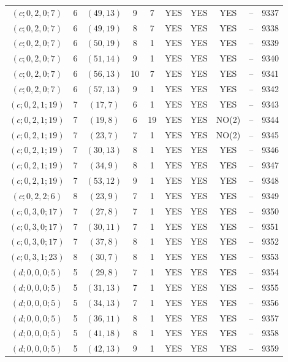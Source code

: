 \begin{longtable}{|c|c|c|c|c|c|c|c|c|c|}
$(c; 0, 2, 0; 7)$ & 6 & $(49, 13)$ & 9 & 7 & YES & YES & YES & -- & 9337\\
$(c; 0, 2, 0; 7)$ & 6 & $(49, 19)$ & 8 & 7 & YES & YES & YES & -- & 9338\\
$(c; 0, 2, 0; 7)$ & 6 & $(50, 19)$ & 8 & 1 & YES & YES & YES & -- & 9339\\
$(c; 0, 2, 0; 7)$ & 6 & $(51, 14)$ & 9 & 1 & YES & YES & YES & -- & 9340\\
$(c; 0, 2, 0; 7)$ & 6 & $(56, 13)$ & 10 & 7 & YES & YES & YES & -- & 9341\\
$(c; 0, 2, 0; 7)$ & 6 & $(57, 13)$ & 9 & 1 & YES & YES & YES & -- & 9342\\
$(c; 0, 2, 1; 19)$ & 7 & $(17, 7)$ & 6 & 1 & YES & YES & YES & -- & 9343\\
$(c; 0, 2, 1; 19)$ & 7 & $(19, 8)$ & 6 & 19 & YES & YES & NO(2) & -- & 9344\\
$(c; 0, 2, 1; 19)$ & 7 & $(23, 7)$ & 7 & 1 & YES & YES & NO(2) & -- & 9345\\
$(c; 0, 2, 1; 19)$ & 7 & $(30, 13)$ & 8 & 1 & YES & YES & YES & -- & 9346\\
$(c; 0, 2, 1; 19)$ & 7 & $(34, 9)$ & 8 & 1 & YES & YES & YES & -- & 9347\\
$(c; 0, 2, 1; 19)$ & 7 & $(53, 12)$ & 9 & 1 & YES & YES & YES & -- & 9348\\
$(c; 0, 2, 2; 6)$ & 8 & $(23, 9)$ & 7 & 1 & YES & YES & YES & -- & 9349\\
$(c; 0, 3, 0; 17)$ & 7 & $(27, 8)$ & 7 & 1 & YES & YES & YES & -- & 9350\\
$(c; 0, 3, 0; 17)$ & 7 & $(30, 11)$ & 7 & 1 & YES & YES & YES & -- & 9351\\
$(c; 0, 3, 0; 17)$ & 7 & $(37, 8)$ & 8 & 1 & YES & YES & YES & -- & 9352\\
$(c; 0, 3, 1; 23)$ & 8 & $(30, 7)$ & 8 & 1 & YES & YES & YES & -- & 9353\\
$(d; 0, 0, 0; 5)$ & 5 & $(29, 8)$ & 7 & 1 & YES & YES & YES & -- & 9354\\
$(d; 0, 0, 0; 5)$ & 5 & $(31, 13)$ & 7 & 1 & YES & YES & YES & -- & 9355\\
$(d; 0, 0, 0; 5)$ & 5 & $(34, 13)$ & 7 & 1 & YES & YES & YES & -- & 9356\\
$(d; 0, 0, 0; 5)$ & 5 & $(36, 11)$ & 8 & 1 & YES & YES & YES & -- & 9357\\
$(d; 0, 0, 0; 5)$ & 5 & $(41, 18)$ & 8 & 1 & YES & YES & YES & -- & 9358\\
$(d; 0, 0, 0; 5)$ & 5 & $(42, 13)$ & 9 & 1 & YES & YES & YES & -- & 9359\\

\end{longtable}
